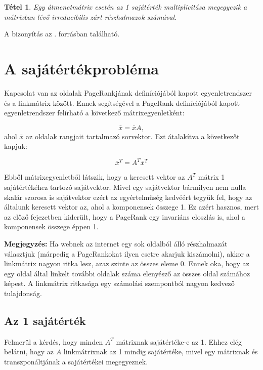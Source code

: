 \documentclass[12pt,a4paper]{article}
\newtheorem{tetel}{Tétel}
\begin{document}
\begin{tetel}
	Egy átmenetmátrix esetén az 1 sajátérték multiplicitása megegyezik a mátrixban lévő irreducibilis zárt részhalmazok számával.
\end{tetel}
A bizonyítás az \cite{irreducible_closed}. forrásban található.

\section{A sajátértékprobléma}

Kapcsolat van az oldalak PageRankjának definíciójából kapott egyenletrendszer és a linkmátrix között. Ennek segítségével a PageRank definíciójából kapott egyenletrendszer felírható a következő mátrixegyenletként:

\[ \bar{x} = \bar{x} A, \]
ahol $\bar{x}$ az oldalak rangjait tartalmazó sorvektor. Ezt átalakítva a következőt kapjuk:

\[ \bar{x}^T = A^T \bar{x}^T \]

Ebből mátrixegyenletből látszik, hogy a keresett vektor az $A^T$ mátrix 1 sajátértékéhez tartozó sajátvektor. Mivel egy sajátvektor bármilyen nem nulla skalár szorosa is sajátvektor ezért az egyértelműség kedvéért tegyük fel, hogy az általunk keresett vektor az, ahol a komponensek összege 1. Ez azért hasznos, mert az előző fejezetben kiderült, hogy a PageRank egy invariáns eloszlás is, ahol a komponensek összege éppen 1.

\vspace{0.1cm}
\textbf{Megjegyzés:} Ha webnek az internet egy sok oldalból álló részhalmazát választjuk (márpedig a PageRankokat ilyen esetre akarjuk kiszámolni), akkor a linkmátrix nagyon ritka lesz, azaz szinte az összes eleme 0. Ennek oka, hogy az egy oldal által linkelt további oldalak száma elenyésző az összes oldal számához képest. A linkmátrix ritkasága egy számolási szempontból nagyon kedvező tulajdonság. 

\subsection{Az 1 sajátérték}\label{egy_sajatertek}

Felmerül a kérdés, hogy minden $A^T$ mátrixnak sajátértéke-e az 1. Ehhez elég belátni, hogy az $A$ linkmátrixnak az 1 mindig sajátértéke, mivel egy mátrixnak és transzponáltjának a sajátértékei megegyeznek.
\end{document}
